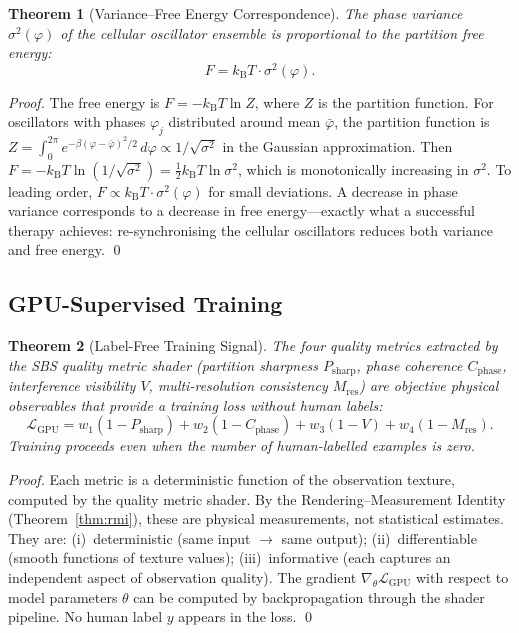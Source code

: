 \documentclass[11pt,twocolumn,a4paper]{article}
\newtheorem{theorem}{Theorem}[section]
\newcommand{\kb}{k_{\mathrm{B}}}
\begin{document}
\begin{theorem}[Variance--Free Energy Correspondence]
\label{thm:variance-free-energy}
The phase variance $\sigma^2(\varphi)$ of the cellular oscillator
ensemble is proportional to the partition free energy:
\begin{equation}
  F = \kb T \cdot \sigma^2(\varphi).
  \label{eq:variance-free-energy}
\end{equation}
\end{theorem}

\begin{proof}
The free energy is $F = -\kb T \ln Z$, where $Z$ is the partition
function.  For oscillators with phases $\varphi_j$ distributed around
mean $\bar{\varphi}$, the partition function is
$Z = \int_0^{2\pi} e^{-\beta(\varphi - \bar{\varphi})^2/2}\,d\varphi
\propto 1/\sqrt{\sigma^2}$ in the Gaussian approximation.  Then
$F = -\kb T \ln(1/\sqrt{\sigma^2}) = \tfrac{1}{2}\kb T \ln \sigma^2$,
which is monotonically increasing in $\sigma^2$.  To leading order,
$F \propto \kb T \cdot \sigma^2(\varphi)$ for small deviations.
A decrease in phase variance corresponds to a decrease in free
energy---exactly what a successful therapy achieves: re-synchronising
the cellular oscillators reduces both variance and free energy.  \qed
\end{proof}


\subsection{GPU-Supervised Training}

\begin{theorem}[Label-Free Training Signal]
\label{thm:gpu-supervised}
The four quality metrics extracted by the SBS quality metric shader
(partition sharpness $P_{\mathrm{sharp}}$, phase coherence
$C_{\mathrm{phase}}$, interference visibility $V$, multi-resolution
consistency $M_{\mathrm{res}}$) are objective physical observables
that provide a training loss without human labels:
\begin{equation}
  \mathcal{L}_{\mathrm{GPU}} = w_1(1 - P_{\mathrm{sharp}})
  + w_2(1 - C_{\mathrm{phase}}) + w_3(1 - V)
  + w_4(1 - M_{\mathrm{res}}).
  \label{eq:gpu-loss}
\end{equation}
Training proceeds even when the number of human-labelled examples is
zero.
\end{theorem}

\begin{proof}
Each metric is a deterministic function of the observation texture,
computed by the quality metric shader.  By the Rendering--Measurement
Identity (Theorem~\ref{thm:rmi}), these are physical measurements,
not statistical estimates.  They are: (i)~deterministic (same input
$\to$ same output); (ii)~differentiable (smooth functions of texture
values); (iii)~informative (each captures an independent aspect of
observation quality).  The gradient
$\nabla_\theta \mathcal{L}_{\mathrm{GPU}}$ with respect to model
parameters $\theta$ can be computed by backpropagation through the
shader pipeline.  No human label $y$ appears in the
loss.  \qed
\end{proof}
\end{document}
